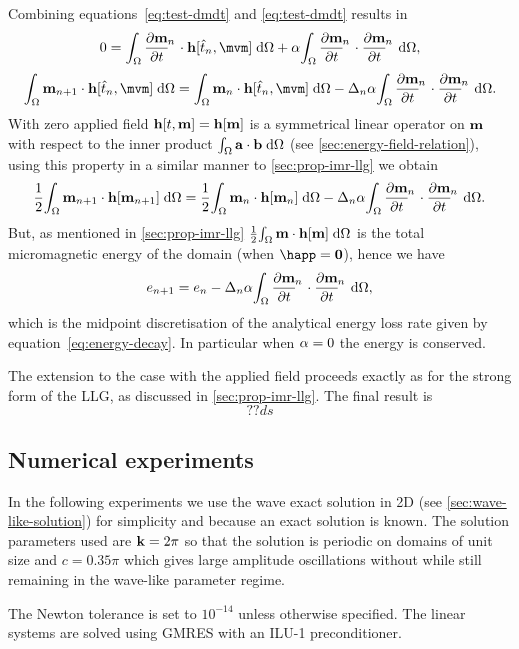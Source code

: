 Combining equations~\eqref{eq:test-dmdt} and \eqref{eq:test-dmdt} results in
\begin{equation}
  0 = \intd{\dmdtm \cdot \hv[\tm, \mvm]} + \dampc \intd{\dmdtm \cdot \dmdtm},
\end{equation}
\ie
\begin{equation}
  \intd{\mv_{n+1} \cdot \hv[\tm, \mvm]} = \intd{\mv_n \cdot \hv[\tm, \mvm]} - \dtn \dampc \intd{\dmdtm \cdot \dmdtm}.
\end{equation}
With zero applied field $\mathbf{h}[t, \mathbf{m}] = \mathbf{h}[\mathbf{m}]$ is a symmetrical linear operator on $\mathbf{m}$ with respect to the inner product ${\int_{\Omega} {\mathbf{a}} \cdot {\mathbf{b}} {\; \text{d}} {\Omega}}$ (see \autoref{sec:energy-field-relation}), using this property in a similar manner to \autoref{sec:prop-imr-llg} we obtain
\begin{equation}
  \frac{1}{2}\intd{\mv_{n+1} \cdot \hv[\mv_{n+1}]} = \frac{1}{2}\intd{\mv_n \cdot \hv[\mv_n]} - \dtn \dampc \intd{\dmdtm \cdot \dmdtm}.
\end{equation}
But, as mentioned in \autoref{sec:prop-imr-llg} $\frac{1}{2}{\int_{\Omega} \mathbf{m} \cdot \mathbf{h}[\mathbf{m}] {\; \text{d}} {\Omega}}$ is the total micromagnetic energy of the domain (when $\happ = \zerov$), hence we have
\begin{equation}
  \e_{n+1} = \e_n - \dtn \dampc \intd{\dmdtm \cdot \dmdtm},
\end{equation}
which is the midpoint discretisation of the analytical energy loss rate given by equation~\eqref{eq:energy-decay}.
In particular when $\alpha = 0$ the energy is conserved.

The extension to the case with the applied field proceeds exactly as for the strong form of the LLG, as discussed in \autoref{sec:prop-imr-llg}.
The final result is
\begin{equation}
  ??ds
\end{equation}


\subsection{Numerical experiments}
\label{sec:numer-exper}

In the following experiments we use the wave exact solution in 2D (see \autoref{sec:wave-like-solution}) for simplicity and because an exact solution is known.
The solution parameters used are $\mathbf{k} = 2\pi$ so that the solution is periodic on domains of unit size and $c = 0.35\pi$ which gives large amplitude oscillations without while still remaining in the wave-like parameter regime.

The Newton tolerance is set to $10^{-14}$ unless otherwise specified.
The linear systems are solved using GMRES with an ILU-1 preconditioner.


